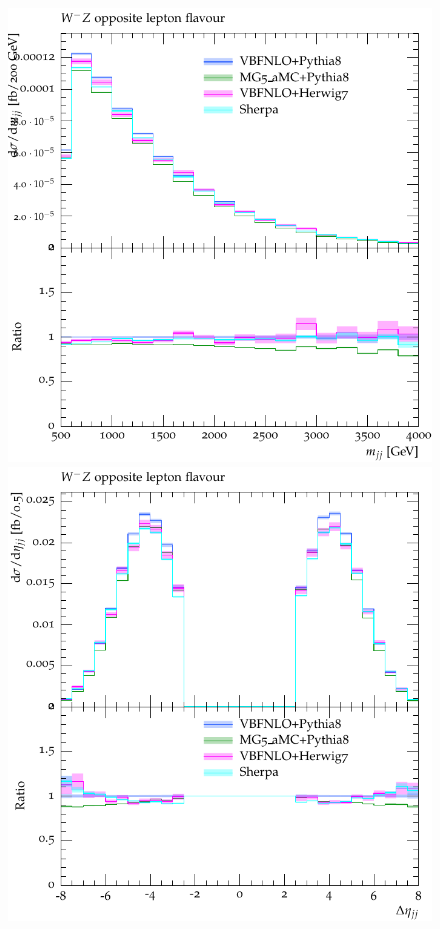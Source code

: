 \documentclass[11pt]{cernrep}
\begin{document}
\begin{figure}[htbp]
\begin{center}
   \includegraphics[scale=0.65]{figs/VBFNLO_WmZ_OF_mjj}
   \includegraphics[scale=0.65]{figs/VBFNLO_WmZ_OF_dEtajj}

\end{center}
\end{figure}
\end{document}
